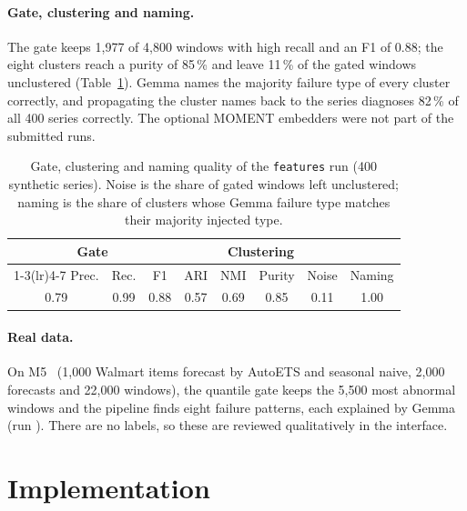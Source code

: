 \documentclass[10pt,twocolumn,a4paper]{article}
\newcommand{\code}[1]{\texttt{\detokenize{#1}}}
\begin{document}
\paragraph{Gate, clustering and naming.}
The gate keeps 1{,}977 of 4{,}800 windows with high recall and an F1 of 0.88; the eight clusters reach a purity of 85\,\% and leave 11\,\% of the gated windows unclustered (Table~\ref{tab:cluster}). Gemma names the majority failure type of every cluster correctly, and propagating the cluster names back to the series diagnoses 82\,\% of all 400 series correctly. The optional MOMENT embedders were not part of the submitted runs.

\begin{table}[t]
  \centering
  \caption{Gate, clustering and naming quality of the \texttt{features} run (400 synthetic series). Noise is the share of gated windows left unclustered; naming is the share of clusters whose Gemma failure type matches their majority injected type.}
  \label{tab:cluster}
  \small
  \setlength{\tabcolsep}{3.5pt}
  \begin{tabular}{@{}cccccccc@{}}
    \toprule
    \multicolumn{3}{c}{Gate} & \multicolumn{4}{c}{Clustering} & \\
    \cmidrule(r){1-3}\cmidrule(lr){4-7}
    Prec. & Rec. & F1 & ARI & NMI & Purity & Noise & Naming \\
    \midrule
    0.79 & 0.99 & 0.88 & 0.57 & 0.69 & 0.85 & 0.11 & 1.00 \\
    \bottomrule
  \end{tabular}
\end{table}

\paragraph{Real data.}
On M5~\cite{makridakis2022} (1{,}000 Walmart items forecast by AutoETS and seasonal naive, 2{,}000 forecasts and 22{,}000 windows), the quantile gate keeps the 5{,}500 most abnormal windows and the pipeline finds eight failure patterns, each explained by Gemma (run \code{m5_features}). There are no labels, so these are reviewed qualitatively in the interface.

\section{Implementation}
\label{sec:impl}
\end{document}
